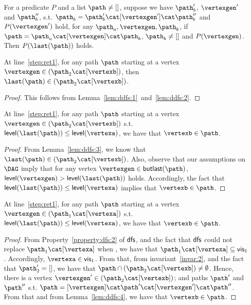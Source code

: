 \begin{mylem}
\label{lem:ddfs:2}
For a predicate $P$ and a list $\path \neq []$, suppose we have $\path_b'$, $\vertexgen'$ and $\path_b''$, s.t. $\path_b=\path_b'\cat[\vertexgen']\cat\path_b''$ and $P(\vertexgen')$ hold, for any $\path_a,\vertexgen,\path_b$, if $\path=\path_a\cat[\vertexgen]\cat\path_b$, $\path_b\neq[]$ and $P(\vertexgen)$.
Then $P(\last(\path))$ holds.
\end{mylem}

\begin{mylem}
\label{lem:ddfs:3}
At line~\ref{step:ret1}, for any path $\path$ starting at a vertex $\vertexgen\in(\pathb\cat[\vertexb])$, then $\last(\path)\in(\pathb\cat[\vertexb])$.
\end{mylem}
\begin{proof}
This follows from Lemma~\ref{lem:ddfs:1}~and~\ref{lem:ddfs:2}.
\end{proof}


\begin{mylem}
\label{lem:ddfs:4}
At line~\ref{step:ret1}, for any path $\path$ starting at a vertex $\vertexgen\in(\pathb\cat[\vertexb])$ s.t.\ $\level(\last(\path)) \leq \level(\vertexa)$, we have that $\vertexb\in\path$.
\end{mylem}
\begin{proof}
From Lemma~\ref{lem:ddfs:3}, we know that $\last(\path) \in (\pathb\cat[\vertexb])$.
Also, observe that our assumptions on $\DAG$ imply that for any vertex $\vertexgen\in\butlast(\path)$, $\level(\vertexgen) > \level (\last (\path))$ holds.
Accordingly, the fact that $\level(\last(\path)) \leq \level(\vertexa)$ implies that $\vertexb\in\path$.
\end{proof}


\begin{mylem}
\label{lem:ddfs:5}
At line~\ref{step:ret1}, for any path $\path$ starting at a vertex $\vertexgen\in(\patha\cat[\vertexa])$ s.t.\ $\level(\last(\path)) \leq \level(\vertexa)$, we have that $\vertexb\in\path$.
\end{mylem}
\begin{proof}
From Property~\ref{property:dfs:2} of $\textsf{\upshape dfs}$, and the fact that $\textsf{\upshape dfs}$ could not replace $\patha\cat[\vertexa]$ when , we have that $\patha\cat[\vertexa]\subseteq\visa$.
Accordingly, $\vertexa\in\visa$.
From that, from invariant~\ref{invar:2}, and the fact that $\pathb'=[]$, we have that $\path\cap(\pathb\cat[\vertexb])\neq\emptyset$.
Hence, there is a vertex $\vertexgen'\in(\pathb\cat[\vertexb])$; and paths $\path'$ and $\path''$ s.t. $\path=[\vertexgen]\cat\path'\cat[\vertexgen']\cat\path''$.
From that and from Lemma~\ref{lem:ddfs:4}, we have that $\vertexb\in\path$.
\end{proof}

